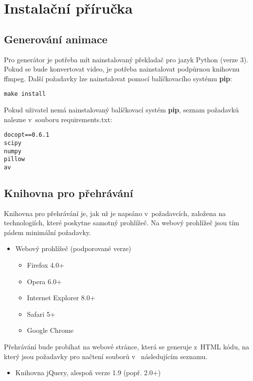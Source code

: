 \chapter{Instalační příručka}
\label{chapter:installation}

\section{Generování animace}

Pro generátor je potřeba mít nainstalovaný překladač pro jazyk Python (verze 3). Pokud se bude konvertovat video, je potřeba nainstalovat podpůrnou knihovnu ffmpeg\cite{videolib}. Další požadavky lze nainstalovat pomocí balíčkovacího systému \textbf{pip}\cite{pip}:

\begin{lstlisting}
make install
\end{lstlisting}

Pokud uživatel nemá nainstalovaný balíčkovací systém \textbf{pip}, seznam požadavků nalezne v~souboru requirements.txt:

\begin{lstlisting}
docopt==0.6.1
scipy
numpy
pillow
av
\end{lstlisting}

\newpage
\section{Knihovna pro přehrávání}

Knihovna pro přehrávání je, jak už je napsáno v~požadavcích, založena na technologiích, které poskytne samotný prohlížeč. Na webový prohlížeč jsou tím pádem minimální požadavky. 

\begin{itemize}
  \item Webový prohlížeč (podporované verze)
  \begin{itemize}  
  \item Firefox 4.0+ 
  \item Opera 6.0+
  \item Internet Explorer 8.0+
  \item  Safari 5+
  \item Google Chrome
  \end{itemize}
\end{itemize}

Přehrávání bude probíhat na webové stránce, která se generuje z~HTML kódu, na který jsou požadavky pro načtení souborů v ~následujícím seznamu.

\begin{itemize}
\item Knihovna jQuery, alespoň verze 1.9 (popř. 2.0+)
\end{itemize}
